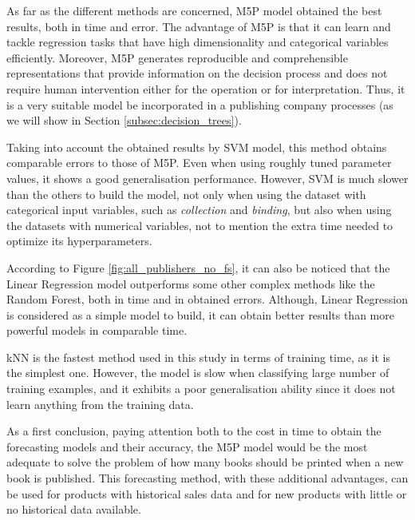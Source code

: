 \documentclass[a4paper,10pt,twocolumn,preprint,3p]{elsarticle}
\begin{document}
As far as the different methods are concerned, M5P model obtained the best results, 
both in time and error. The advantage of M5P is that it can learn and tackle 
regression tasks that have high dimensionality and categorical variables efficiently. 
Moreover, M5P generates reproducible and comprehensible representations that 
provide information on the decision process and does not require human intervention 
either for the operation or for interpretation. Thus, it is a very suitable model 
be incorporated in a publishing company processes (as we will show in 
Section \ref{subsec:decision_trees}).

Taking into account the obtained results by SVM model, this method obtains comparable 
errors to those of M5P. Even when using roughly tuned parameter values, it shows 
a good generalisation performance. However, SVM is much slower than the others to build 
the model, not only when using the dataset with categorical input variables, such 
as \emph{collection} and \emph{binding}, but also when using the datasets with 
numerical variables, not to mention the extra time needed to optimize its hyperparameters.

According to Figure \ref{fig:all_publishers_no_fs}, it can also be noticed that 
the Linear Regression model outperforms some other complex methods like the 
Random Forest, both in time and in obtained errors. 
Although, Linear Regression is considered as a simple model to build, it can obtain better results than more powerful models in comparable time.

kNN is the fastest method used in this study in terms of training time, as it 
is the simplest one. However, the model is slow when classifying large number of 
training examples, and it exhibits a poor generalisation ability since it does 
not learn anything from the training data.


As a first conclusion, paying attention both to the cost in time to obtain the 
forecasting models and their accuracy, the M5P model would be the most adequate 
to solve the problem of how many books should be printed when a new book is 
published. This forecasting method, with these additional advantages, can be used 
for products with historical sales data and for new products with little or 
no historical data available.
\end{document}
